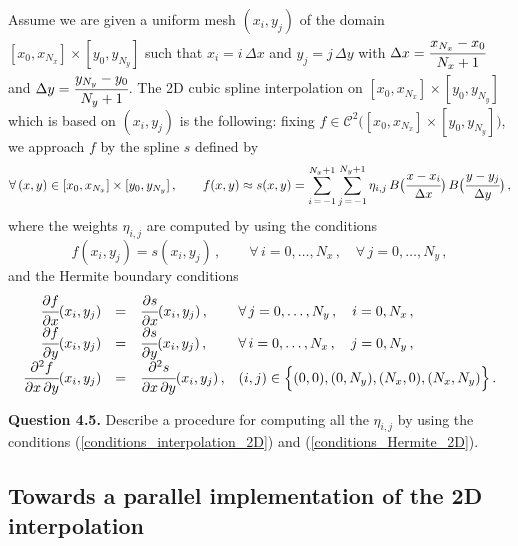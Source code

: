 \documentclass[10pt]{article}
\newcommand{\D}{{\partial}}
\newcommand{\Cl}{{\mathcal C}}
\begin{document}
Assume we are given a uniform mesh $(x_{i},y_{j})$ of the domain $[x_{0},x_{N_{x}}] \times [y_{0},y_{N_{y}}]$ such that $x_{i} = i\,\Delta x$ and $y_{j} = j\,\Delta y$ with $\Delta x = \cfrac{x_{N_{x}}-x_{0}}{N_{x}+1}$ and $\Delta y = \cfrac{y_{N_{y}}-y_{0}}{N_{y}+1}$. The 2D cubic spline interpolation on $[x_{0},x_{N_{x}}] \times [y_{0},y_{N_{y}}]$ which is based on $(x_{i},y_{j})$ is the following: fixing $f \in \Cl^{2}\big([x_{0},x_{N_{x}}] \times [y_{0},y_{N_{y}}]\big)$, we approach $f$ by the spline $s$ defined by
\begin{equation}
\forall\, (x,y) \in [x_{0},x_{N_{x}}] \times [y_{0},y_{N_{y}}] \, , \qquad f(x,y) \approx s(x,y) = \sum_{i\,=\,-1}^{N_{x}+1} \sum_{j\,=\,-1}^{N_{y}+1} \eta_{i,j}\,B\big(\cfrac{x-x_{i}}{\Delta x}\big) \, B\big(\cfrac{y-y_{j}}{\Delta y}\big) \, ,
\end{equation}
where the weights $\eta_{i,j}$ are computed by using the conditions
\begin{equation} \label{conditions_interpolation_2D}
f(x_{i},y_{j}) = s(x_{i},y_{j}) \, , \qquad \forall\, i=0,\dots,N_{x}\,, \quad \forall\,j=0,\dots,N_{y} \, ,
\end{equation}
and the Hermite boundary conditions
\begin{equation} \label{conditions_Hermite_2D}
\begin{array}{rcll}
\cfrac{\D f}{\D x}(x_{i},y_{j}) &=& \cfrac{\D s}{\D x}(x_{i},y_{j}) \, , & \forall\, j=0,\dots,N_{y} \, , \quad i=0,N_{x} \, , \\
\cfrac{\D f}{\D y}(x_{i},y_{j}) &=& \cfrac{\D s}{\D y}(x_{i},y_{j}) \, , & \forall\, i=0,\dots,N_{x} \, , \quad j=0,N_{y} \, , \\
\cfrac{\D^{2}f}{\D x\,\D y}(x_{i},y_{j}) &=& \cfrac{\D^{2}s}{\D x\,\D y}(x_{i},y_{j}) \, , & (i,j) \in \Big\{(0,0),(0,N_{y}),(N_{x},0),(N_{x},N_{y})\Big\}\, .
\end{array}
\end{equation}

\begin{leftbar}
\textbf{Question 4.5.} Describe a procedure for computing all the $\eta_{i,j}$ by using the conditions (\ref{conditions_interpolation_2D}) and (\ref{conditions_Hermite_2D}).
\end{leftbar}




\subsection{Towards a parallel implementation of the 2D interpolation}
\end{document}
